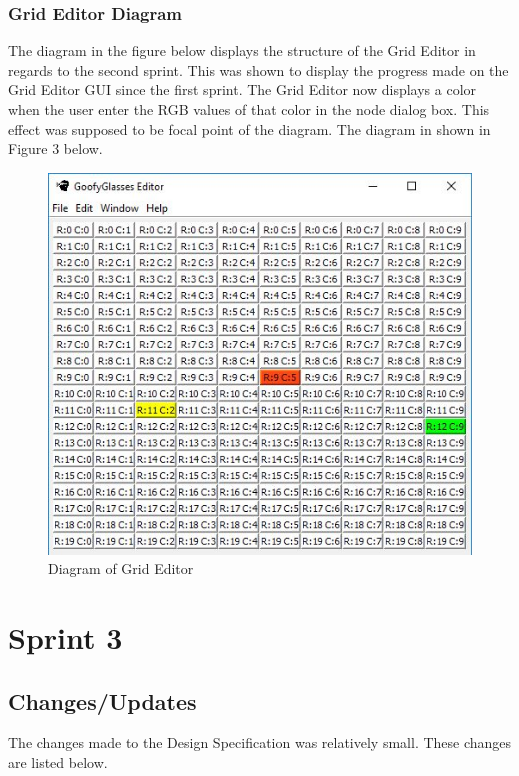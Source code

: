 \documentclass[12pt]{article}
\begin{document}
\begin{appendices}
      \subsubsection {Grid Editor Diagram}
        The diagram in the figure below displays the structure of the Grid Editor in regards to the second sprint. This was shown to display the progress made on the Grid Editor GUI since the first sprint. The Grid Editor now displays a color when the user enter the RGB values of that color in the node dialog box. This effect was supposed to be focal point of the diagram. The diagram in shown in Figure 3 below.
      
      \begin{figure}[ht!]
        \centering
        \includegraphics[width=.4\linewidth]{protoGrid.JPG}
        \caption{Diagram of Grid Editor \label{overflow}}
      \end{figure}
    
  
    
   \section{Sprint 3} 
      \subsection{Changes/Updates}
        The changes made to the Design Specification was relatively small. These changes are listed below.
      

\end{appendices}
\end{document}
